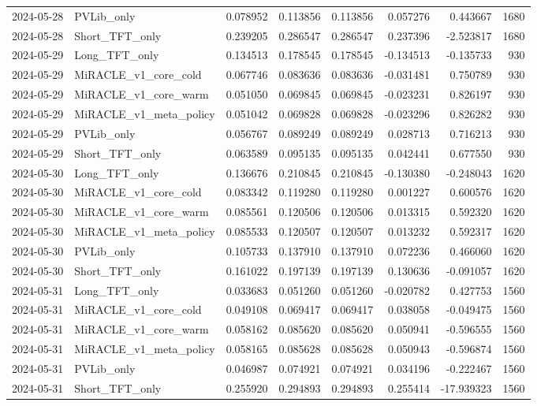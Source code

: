 \begin{tabular}{llrrrrrr}
2024-05-28 & PVLib_only & 0.078952 & 0.113856 & 0.113856 & 0.057276 & 0.443667 & 1680 \\
2024-05-28 & Short_TFT_only & 0.239205 & 0.286547 & 0.286547 & 0.237396 & -2.523817 & 1680 \\
2024-05-29 & Long_TFT_only & 0.134513 & 0.178545 & 0.178545 & -0.134513 & -0.135733 & 930 \\
2024-05-29 & MiRACLE_v1_core_cold & 0.067746 & 0.083636 & 0.083636 & -0.031481 & 0.750789 & 930 \\
2024-05-29 & MiRACLE_v1_core_warm & 0.051050 & 0.069845 & 0.069845 & -0.023231 & 0.826197 & 930 \\
2024-05-29 & MiRACLE_v1_meta_policy & 0.051042 & 0.069828 & 0.069828 & -0.023296 & 0.826282 & 930 \\
2024-05-29 & PVLib_only & 0.056767 & 0.089249 & 0.089249 & 0.028713 & 0.716213 & 930 \\
2024-05-29 & Short_TFT_only & 0.063589 & 0.095135 & 0.095135 & 0.042441 & 0.677550 & 930 \\
2024-05-30 & Long_TFT_only & 0.136676 & 0.210845 & 0.210845 & -0.130380 & -0.248043 & 1620 \\
2024-05-30 & MiRACLE_v1_core_cold & 0.083342 & 0.119280 & 0.119280 & 0.001227 & 0.600576 & 1620 \\
2024-05-30 & MiRACLE_v1_core_warm & 0.085561 & 0.120506 & 0.120506 & 0.013315 & 0.592320 & 1620 \\
2024-05-30 & MiRACLE_v1_meta_policy & 0.085533 & 0.120507 & 0.120507 & 0.013232 & 0.592317 & 1620 \\
2024-05-30 & PVLib_only & 0.105733 & 0.137910 & 0.137910 & 0.072236 & 0.466060 & 1620 \\
2024-05-30 & Short_TFT_only & 0.161022 & 0.197139 & 0.197139 & 0.130636 & -0.091057 & 1620 \\
2024-05-31 & Long_TFT_only & 0.033683 & 0.051260 & 0.051260 & -0.020782 & 0.427753 & 1560 \\
2024-05-31 & MiRACLE_v1_core_cold & 0.049108 & 0.069417 & 0.069417 & 0.038058 & -0.049475 & 1560 \\
2024-05-31 & MiRACLE_v1_core_warm & 0.058162 & 0.085620 & 0.085620 & 0.050941 & -0.596555 & 1560 \\
2024-05-31 & MiRACLE_v1_meta_policy & 0.058165 & 0.085628 & 0.085628 & 0.050943 & -0.596874 & 1560 \\
2024-05-31 & PVLib_only & 0.046987 & 0.074921 & 0.074921 & 0.034196 & -0.222467 & 1560 \\
2024-05-31 & Short_TFT_only & 0.255920 & 0.294893 & 0.294893 & 0.255414 & -17.939323 & 1560 \\

\end{tabular}
